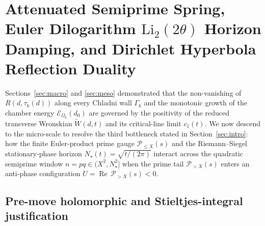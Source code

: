 \documentclass[11pt,reqno]{amsart}
\theoremstyle{definition}
\theoremstyle{remark}
\numberwithin{equation}{section}
\newcommand{\RePt}{\operatorname{Re}}
\begin{document}
\section{Attenuated Semiprime Spring, Euler Dilogarithm $\mathrm{Li}_2(2\theta)$ Horizon Damping, and Dirichlet Hyperbola Reflection Duality}\label{sec:micro}

Sections~\ref{sec:macro} and \ref{sec:meso} demonstrated that the non-vanishing of $R(d,\tau_k(d))$ along every Chladni wall $\Gamma_k$ and the monotonic growth of the chamber energy $\mathcal{E}_{\Omega_k}(d_0)$ are governed by the positivity of the reduced transverse Wronskian $\widetilde{W}(d,t)$ and its critical-line limit $c_1(t)$. We now descend to the micro-scale to resolve the third bottleneck stated in Section~\ref{sec:intro}: how the finite Euler-product prime gauge $\mathcal{P}_{\le X}(s)$ and the Riemann--Siegel stationary-phase horizon $N_\star(t) = \sqrt{t/(2\pi)}$ interact across the quadratic semiprime window $n = pq \in (X^2, N_\star^2]$ when the prime tail $\mathcal{P}_{>X}(s)$ enters an anti-phase configuration $U = \RePt\,\mathcal{P}_{>X}(s) < 0$.

\subsection{Pre-move holomorphic and Stieltjes-integral justification}\label{subsec:pre-move}
\end{document}
